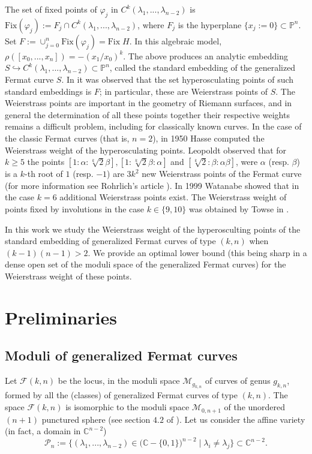 \documentclass{amsart}
\newcommand{\C}[3]{\ensuremath{C^{#1}(#3_1,...,#3_{#2})}}
\begin{document}
The set of fixed points of  $\varphi_j$ in $\C{k}{n-2}{\lambda}$ is ${\mathrm{Fix}}(\varphi_j):=F_j \cap \C{k}{n-2}{\lambda}$,
where $F_j$ is the hyperplane $\{x_j:=0\}\subset {\mathbb{P}}^n$. 
Set $F:=\cup_{j=0}^n{\mathrm{Fix}}(\varphi_j)={\mathrm{Fix}}\;H$.
In this algebraic model, $\rho([x_0,...,x_n])=-(x_{1}/x_{0})^{k}$. The above produces an analytic embedding 
$S \hookrightarrow  \C{k}{n-2}{\lambda}  \subset {\mathbb{P}}^n$, called the standard embedding of the 
generalized Fermat curve $S$.
In \cite{HKLP16} it  was observed that the set hyperosculating points 
of such standard embeddings is $F$; in particular, these are Weierstrass points of $S$. The Weierstrass points are important in the geometry of Riemann surfaces,  and in general the determination of all these  points  together their respective weights remains a difficult problem, including for classically known curves. In the case of the classic Fermat curves (that is, $n=2$), in 1950 Hasse \cite{Has50} computed the Weierstrass weight of the 
hyperosculating points.    Leopoldt observed that for $k\geq 5$ the points $[1:\alpha: \sqrt[k]{2}\beta],
[1:\sqrt[k]{2}\beta:\alpha]$ and  $ [\sqrt[k]{2}:\beta: \alpha\beta]$, were $\alpha$ (resp. $\beta$) is a $k$-th root of $1$ (resp. $-1$) are $3k^2$ 
new Weierstrass points of the Fermat curve (for more information see Rohrlich's article \cite{Roh82}).  
 In 1999 Watanabe \cite{Wat99} showed that in the case $k=6$ additional Weierstrass points exist.
The Weierstrass weight of points fixed by involutions in the case $k \in \{9,10\}$ was obtained by 
Towse in \cite{Tow00}.


In this work we study the  Weierstrass weight of the hyperosculting points of the standard embedding of generalized Fermat curves of type $(k,n)$ when $(k-1)(n-1)>2$. We provide an  optimal lower bound 
(this being sharp in a dense open set  of  the moduli space of the generalized Fermat curves) for the Weierstrass weight of these points.



\section{Preliminaries}\label{sec:hosc}

\subsection{Moduli of generalized Fermat curves}\label{sec:pre-mod-esp}
Let $\mathcal{F}(k,n)$ be the locus, in the moduli space ${\mathcal M}_{g_{k,n}}$ of curves of genus $g_{k,n}$, formed by all the (classes) of generalized Fermat curves of  type $(k,n)$.  The space $\mathcal{F}(k,n)$ is isomorphic to the moduli space $\mathcal{M}_{0,n+1}$ of the unordered $(n+1)$ punctured sphere (see section $4.2$ of \cite{GHL09}).  
Let us consider the affine variety (in fact, a domain in ${\mathbb C}^{n-2}$)
$$\mathcal{P}_n:=\{(\lambda_1,...,\lambda_{n-2})\in
\mbox{(${\mathbb{C}}-\{0,1\}$)}^{n-2}\mid \lambda_i\neq \lambda_j\} \subset {\mathbb C}^{n-2}.$$
\end{document}

